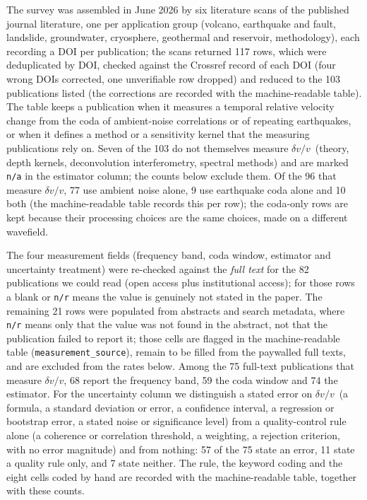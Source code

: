 \documentclass[
  referee]{gji}
\providecommand{\dvv}{\ensuremath{\delta v/v}}
\begin{document}
The survey was assembled in June 2026 by six literature scans of the
published journal literature, one per application group (volcano,
earthquake and fault, landslide, groundwater, cryosphere, geothermal and
reservoir, methodology), each recording a DOI per publication; the scans
returned 117 rows, which were deduplicated by DOI, checked against the
Crossref record of each DOI (four wrong DOIs corrected, one unverifiable
row dropped) and reduced to the 103 publications listed (the corrections
are recorded with the machine-readable table). The table keeps a
publication when it measures a temporal relative velocity change from
the coda of ambient-noise correlations or of repeating earthquakes, or
when it defines a method or a sensitivity kernel that the measuring
publications rely on. Seven of the 103 do not themselves measure
\dvv~(theory, depth kernels, deconvolution interferometry, spectral
methods) and are marked \texttt{n/a} in the estimator column; the counts
below exclude them. Of the 96 that measure \dvv, 77 use ambient noise
alone, 9 use earthquake coda alone and 10 both (the machine-readable
table records this per row); the coda-only rows are kept because their
processing choices are the same choices, made on a different wavefield.

The four measurement fields (frequency band, coda window, estimator and
uncertainty treatment) were re-checked against the \emph{full text} for
the 82 publications we could read (open access plus institutional
access); for those rows a blank or \texttt{n/r} means the value is
genuinely not stated in the paper. The remaining 21 rows were populated
from abstracts and search metadata, where \texttt{n/r} means only that
the value was not found in the abstract, not that the publication failed
to report it; those cells are flagged in the machine-readable table
(\texttt{measurement\_source}), remain to be filled from the paywalled
full texts, and are excluded from the rates below. Among the 75
full-text publications that measure \dvv, 68 report the frequency band,
59 the coda window and 74 the estimator. For the uncertainty column we
distinguish a stated error on \dvv~(a formula, a standard deviation or
error, a confidence interval, a regression or bootstrap error, a stated
noise or significance level) from a quality-control rule alone (a
coherence or correlation threshold, a weighting, a rejection criterion,
with no error magnitude) and from nothing: 57 of the 75 state an error,
11 state a quality rule only, and 7 state neither. The rule, the keyword
coding and the eight cells coded by hand are recorded with the
machine-readable table, together with these counts.
\end{document}
